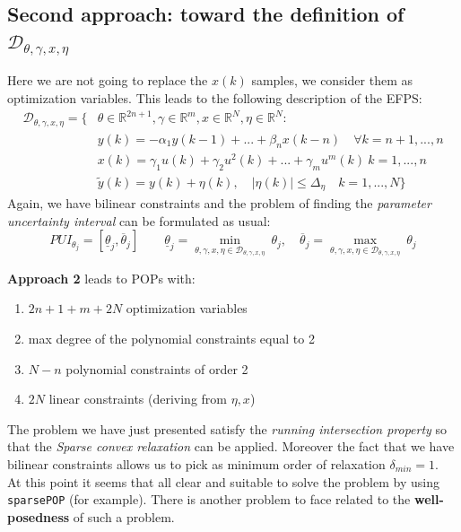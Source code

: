 \subsection{Second approach: toward the definition of $\mathcal{D}_{\theta,\gamma,x,\eta}$}
Here we are not going to replace the $x(k)$ samples, we consider them as optimization variables. This leads to the following description of the EFPS:
\begin{equation}
    \begin{aligned}
        \mathcal{D}_{\theta,\gamma,x,\eta} = \big\{&
            \theta\in\mathbb{R}^{2n+1}, \gamma\in\mathbb{R}^m, x\in\mathbb{R}^N, \eta\in\mathbb{R}^N:\\
            &y(k)=-\alpha_1{y(k-1)+...+\beta_n{x(k-n)}} \quad \forall{k=n+1,...,n}\\
            & x(k)=\gamma_1{u(k)}+\gamma_2{u^2(k)}+...+\gamma_m{u^{m}(k)} \ k=1,...,n \\
            &\tilde{y}(k)=y(k)+\eta(k), \quad 
            \vert \eta(k) \vert \le \Delta_\eta \quad k=1,..., N
        \big\}
    \end{aligned}
\end{equation}
Again, we have bilinear constraints and the problem of finding the \textit{parameter uncertainty interval} can be formulated as usual: 
\begin{equation}
    PUI_{\theta_j} = [
        \underline{\theta}_j,
        \overline{\theta}_j
    ] \qquad  
    \underline{\theta}_j=\min_{\theta,\gamma,x,\eta\in{\mathcal{D}_{\theta,\gamma,x,\eta}}} \ {\theta_j}, \quad
    \overline{\theta}_j=\max_{\theta,\gamma,x,\eta\in{\mathcal{D}_{\theta,\gamma,x,\eta}}} \ {\theta_j} 
\end{equation}

\begin{remark}
    \textbf{Approach 2} leads to POPs with:
    \begin{enumerate}
        \itemsep-0.3em
        \item $2n+1+m+2N$ optimization variables
        \item max degree of the polynomial constraints equal to 2
        \item $N-n$ polynomial constraints of order 2
        \item $2N$ linear constraints (deriving from $\eta,x$)
    \end{enumerate}
\end{remark}

The problem we have just presented satisfy the \textit{running intersection property} so that the \textit{Sparse convex relaxation} can be applied. Moreover the fact that we have bilinear constraints allows us to pick as minimum order of relaxation $\delta_{min}=1$. \\
At this point it seems that all clear and suitable to solve the problem by using \texttt{sparsePOP} (for example). There is another problem to face related to the \textbf{well-posedness} of such a problem.

